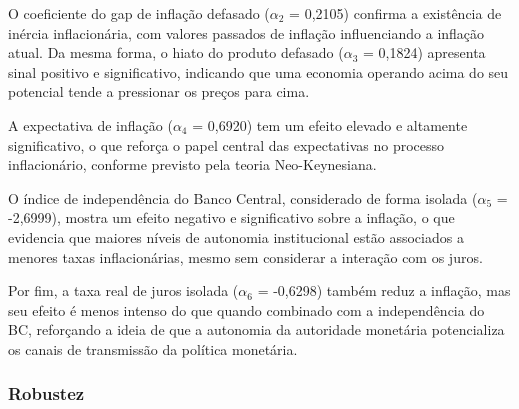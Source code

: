 \documentclass[a4paper,12pt]{article}
\begin{document}
O coeficiente do gap de inflação defasado ($\alpha_2$ = 0,2105) confirma a existência de inércia inflacionária, com valores passados de inflação influenciando a inflação atual. Da mesma forma, o hiato do produto defasado ($\alpha_3$ = 0,1824) apresenta sinal positivo e significativo, indicando que uma economia operando acima do seu potencial tende a pressionar os preços para cima.

A expectativa de inflação ($\alpha_4$ = 0,6920) tem um efeito elevado e altamente significativo, o que reforça o papel central das expectativas no processo inflacionário, conforme previsto pela teoria Neo-Keynesiana.

O índice de independência do Banco Central, considerado de forma isolada ($\alpha_5$ = -2,6999), mostra um efeito negativo e significativo sobre a inflação, o que evidencia que maiores níveis de autonomia institucional estão associados a menores taxas inflacionárias, mesmo sem considerar a interação com os juros.

Por fim, a taxa real de juros isolada ($\alpha_6$ = -0,6298) também reduz a inflação, mas seu efeito é menos intenso do que quando combinado com a independência do BC, reforçando a ideia de que a autonomia da autoridade monetária potencializa os canais de transmissão da política monetária.

\subsubsection*{\textbf{Robustez}}
\end{document}
